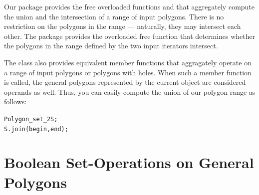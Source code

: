 Our package provides the free overloaded functions  and
 that aggregately compute the union and the intersection
of a range of input polygons. There is no restriction on the polygons in the
range --- naturally, they may intersect each other.
The package provides the overloaded free function 
 that determines whether the polygons in the
range defined by the two input iterators \ccc{[begin, end)} intersect.

The class  also provides equivalent member
functions that aggragately operate on a range of input polygons or
polygons with holes. When such a member function is called, the general 
polygons represented by the current object are considered operands as 
well. Thus, you can easily compute the union of our polygon range as
follows:
\begin{alltt}
  Polygon_set_2 S;
  S.join (begin, end);
\end{alltt} 


\section{Boolean Set-Operations on General Polygons}
\label{bops_sec:bops_gen}

